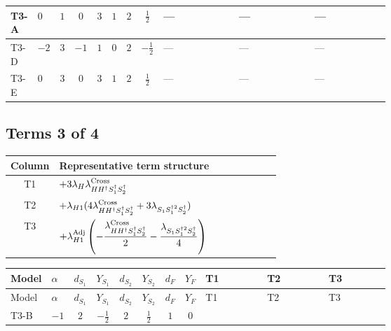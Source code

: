 \documentclass[8pt]{article}
\begin{document}
\begin{landscape}
\begin{longtable}{@{}llcccccc >{\raggedright\arraybackslash}p{0.21\linewidth} >{\raggedright\arraybackslash}p{0.21\linewidth} >{\raggedright\arraybackslash}p{0.21\linewidth}@{}}
\midrule
T3-A & $0$ & $1$ & $0$ & $3$ & $1$ & $2$ & $\frac{1}{2}$ & --- & --- & --- \\
\midrule
T3-D & $-2$ & $3$ & $-1$ & $1$ & $0$ & $2$ & $-\frac{1}{2}$ & --- & --- & --- \\
\midrule
T3-E & $0$ & $3$ & $0$ & $3$ & $1$ & $2$ & $\frac{1}{2}$ & --- & --- & --- \\
\midrule
\bottomrule
\end{longtable}
\clearpage
\subsection*{Terms 3 of 4}
\begin{center}
\begin{tabular}{@{}c >{\raggedright\arraybackslash}p{0.82\linewidth}@{}}
\toprule
Column & Representative term structure \\
\midrule
T1 & \(\displaystyle +3 {\lambda_H} {\lambda_{H H^\dagger S_1^\dagger S_2^\dagger}^{\rm Cross}}\) \\
\midrule
T2 & \(\displaystyle +{\lambda_{H1}} (4 {\lambda_{H H^\dagger S_1^\dagger S_2^\dagger}^{\rm Cross}}+3 {\lambda_{S_1 S_1^{\dagger 2}S_2^\dagger}})\) \\
\midrule
T3 & \(\displaystyle +{\lambda_{H1}^{\rm Adj}} \left(-\frac{{\lambda_{H H^\dagger S_1^\dagger S_2^\dagger}^{\rm Cross}}}{2}-\frac{{\lambda_{S_1 S_1^{\dagger 2}S_2^\dagger}}}{4}\right)\) \\
\midrule
\bottomrule
\end{tabular}
\end{center}
\smallskip
\tiny
\begin{longtable}{@{}llcccccc >{\raggedright\arraybackslash}p{0.21\linewidth} >{\raggedright\arraybackslash}p{0.21\linewidth} >{\raggedright\arraybackslash}p{0.21\linewidth}@{}}
\toprule
Model & $\alpha$ & $d_{S_1}$ & $Y_{S_1}$ & $d_{S_2}$ & $Y_{S_2}$ & $d_F$ & $Y_F$ & T1 & T2 & T3 \\
\midrule
\endfirsthead
\toprule
Model & $\alpha$ & $d_{S_1}$ & $Y_{S_1}$ & $d_{S_2}$ & $Y_{S_2}$ & $d_F$ & $Y_F$ & T1 & T2 & T3 \\
\midrule
\endhead
T3-B & $-1$ & $2$ & $-\frac{1}{2}$ & $2$ & $\frac{1}{2}$ & $1$ & $0$ & \scriptsize\adjustbox{max width=\linewidth}{$\begin{gathered} +3 {\lambda_H} {\lambda_{H H^\dagger S_1^\dagger S_2^\dagger}^{\rm Cross}}\end{gathered}$} & \scriptsize\adjustbox{max width=\linewidth}{$\begin{gathered} +{\lambda_{H1}} (4 {\lambda_{H H^\dagger S_1^\dagger S_2^\dagger}^{\rm Cross}}+3 {\lambda_{S_1 S_1^{\dagger 2}S_2^\dagger}})\end{gathered}$} & \scriptsize\adjustbox{max width=\linewidth}{$\begin{gathered} +{\lambda_{H1}^{\rm Adj}} \left(-\frac{{\lambda_{H H^\dagger S_1^\dagger S_2^\dagger}^{\rm Cross}}}{2}-\frac{{\lambda_{S_1 S_1^{\dagger 2}S_2^\dagger}}}{4}\right)\end{gathered}$} \\

\end{longtable}
\end{landscape}
\end{document}
